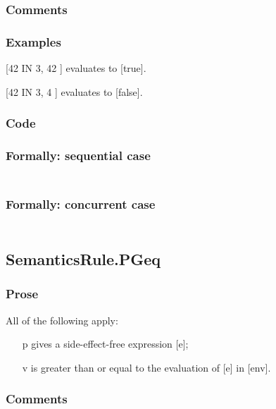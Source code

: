 \documentclass{book}
\begin{document}
    \subsubsection{Comments}

    \subsubsection{Examples}
    [42 IN { 3, 42 }] evaluates to [true].

    [42 IN { 3, 4 }] evaluates to [false].

  \subsubsection{Code}

  \subsubsection{Formally: sequential case}
  \begin{align}
  \end{align} 

  \subsubsection{Formally: concurrent case}
  \begin{align}
  \end{align} 

\subsection{SemanticsRule.PGeq \label{sec:SemanticsRule.PGeq}}

    \subsubsection{Prose}
    All of the following apply:
    \begin{itemize}
    \item [p] gives a side-effect-free expression [e];
    \item [v] is greater than or equal to the evaluation of [e] in [env].
    \end{itemize}

    \subsubsection{Comments}
\end{document}

